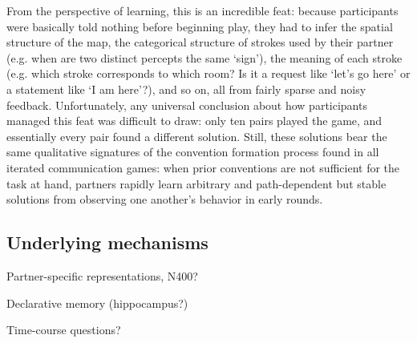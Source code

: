 \documentclass[11pt, floatsintext, jou]{apa6}
\begin{document}
From the perspective of learning, this is an incredible feat: because participants were basically told nothing before beginning play, they had to infer the spatial structure of the map, the categorical structure of strokes used by their partner (e.g. when are two distinct percepts the same `sign'), the meaning of each stroke (e.g. which stroke corresponds to which room? Is it a request like `let's go here' or a statement like `I am here'?), and so on, all from fairly sparse and noisy feedback. Unfortunately, any universal conclusion about how participants managed this feat was difficult to draw: only ten pairs played the game, and essentially every pair found a different solution. Still, these solutions bear the same qualitative signatures of the convention formation process found in all iterated communication games: when prior conventions are not sufficient for the task at hand, partners rapidly learn arbitrary and path-dependent but stable solutions from observing one another's behavior in early rounds. 


\subsection{Underlying mechanisms}

Partner-specific representations, N400? \cite{TesinkEtAl09_MeaningfMRI,VanBerkum08_NeuralSpeakerMessage}

Declarative memory (hippocampus?) \cite{DuffBrownSchmidt12_Hippocampus}

Time-course questions? \cite{HortonGerrig16_MemoryBasedReview}
\end{document}
